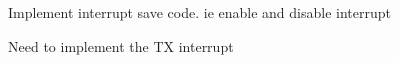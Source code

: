 
\begin{DoxyRefList}
\item[\label{todo__todo000001}%
\hypertarget{todo__todo000001}{}%
Member \hyperlink{_f_i_f_o_8h_a1fe07979ab19f7405a4b5bedbdc26a07}{F\-I\-F\-O\-\_\-\-Counnter\-Buffer\-Count} (void)]Implement interrupt save code. ie enable and disable interrupt  
\item[\label{todo__todo000002}%
\hypertarget{todo__todo000002}{}%
Member \hyperlink{usart2_8c_a0ca6fd0e6f77921dd1123539857ba0a8}{U\-S\-A\-R\-T2\-\_\-\-I\-R\-Q\-Handler} (void)]Need to implement the T\-X interrupt 
\end{DoxyRefList}